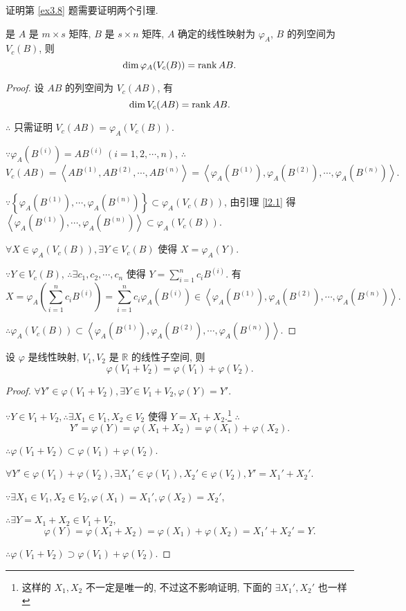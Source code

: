 \documentclass[color=black,device=normal,lang=cn,mode=geye]{elegantnote}
\begin{document}
证明第 \ref{ex3.8} 题需要证明两个引理.
\begin{lemma}\label{l2.3}
    是 $A$ 是 $m\times s$ 矩阵, $B$ 是 $s\times n$ 矩阵, $A$ 确定的线性映射为 $\varphi_A$, $B$ 的列空间为 $V_c(B)$, 则
    \[\dim\varphi_A(V_c(B))=\operatorname{rank} AB.\]
\end{lemma}
\begin{proof}
    设 $AB$ 的列空间为 $V_c(AB)$, 有
    \[\dim V_c(AB)=\operatorname{rank} AB.\]

    $\therefore$ 只需证明 $V_c(AB)=\varphi_A(V_c(B))$.

    $\because\varphi_A(B^{(i)})=AB^{(i)}\ (i=1,2,\cdots,n)$, $\therefore$
    \[V_c(AB)=\left<AB^{(1)},AB^{(2)},\cdots,AB^{(n)}\right>=\left<\varphi_A(B^{(1)}),\varphi_A(B^{(2)}),\cdots,\varphi_A(B^{(n)})\right>.\]

    $\because\left\{\varphi_A(B^{(1)}),\cdots,\varphi_A(B^{(n)})\right\}\subset\varphi_A(V_c(B))$, 由引理 \ref{l2.1} 得 $\left<\varphi_A(B^{(1)}),\cdots,\varphi_A(B^{(n)})\right>\subset\varphi_A(V_c(B))$.

    $\forall X\in\varphi_A(V_c(B)),\exists Y\in V_c(B)$ 使得 $X=\varphi_A(Y)$.
    
    $\because Y\in V_c(B)$, $\therefore\exists c_1,c_2,\cdots,c_n$ 使得 $Y=\sum\limits_{i=1}^nc_iB^{(i)}$. 有
    \[X=\varphi_A\left(\sum\limits_{i=1}^nc_iB^{(i)}\right)=\sum\limits_{i=1}^nc_i\varphi_A(B^{(i)})\in\left<\varphi_A(B^{(1)}),\varphi_A(B^{(2)}),\cdots,\varphi_A(B^{(n)})\right>.\]

    $\therefore\varphi_A(V_c(B))\subset\left<\varphi_A(B^{(1)}),\varphi_A(B^{(2)}),\cdots,\varphi_A(B^{(n)})\right>$.
\end{proof}
\begin{lemma}\label{l2.4}
    设 $\varphi$ 是线性映射, $V_1,V_2$ 是 $\mathbb{R}$ 的线性子空间, 则
    \[\varphi(V_1+V_2)=\varphi(V_1)+\varphi(V_2).\]
\end{lemma}
\begin{proof}
    $\forall Y'\in\varphi(V_1+V_2),\exists Y\in V_1+V_2,\varphi(Y)=Y'$.

    $\because Y\in V_1+V_2,\therefore\exists X_1\in V_1,X_2\in V_2$ 使得 $Y=X_1+X_2$.\footnote{这样的 $X_1,X_2$ 不一定是唯一的, 不过这不影响证明, 下面的 $\exists X_1',X_2'$ 也一样} $\therefore$
    \[Y'=\varphi(Y)=\varphi(X_1+X_2)=\varphi(X_1)+\varphi(X_2).\]

    $\therefore\varphi(V_1+V_2)\subset\varphi(V_1)+\varphi(V_2)$.

    $\forall Y'\in\varphi(V_1)+\varphi(V_2),\exists X_1'\in\varphi(V_1),X_2'\in\varphi(V_2),Y'=X_1'+X_2'$.

    $\because\exists X_1\in V_1,X_2\in V_2,\varphi(X_1)=X_1',\varphi(X_2)=X_2'$,

    $\therefore\exists Y=X_1+X_2\in V_1+V_2$,
    \[\varphi(Y)=\varphi(X_1+X_2)=\varphi(X_1)+\varphi(X_2)=X_1'+X_2'=Y.\]

    $\therefore\varphi(V_1+V_2)\supset\varphi(V_1)+\varphi(V_2)$.
\end{proof}
\end{document}
